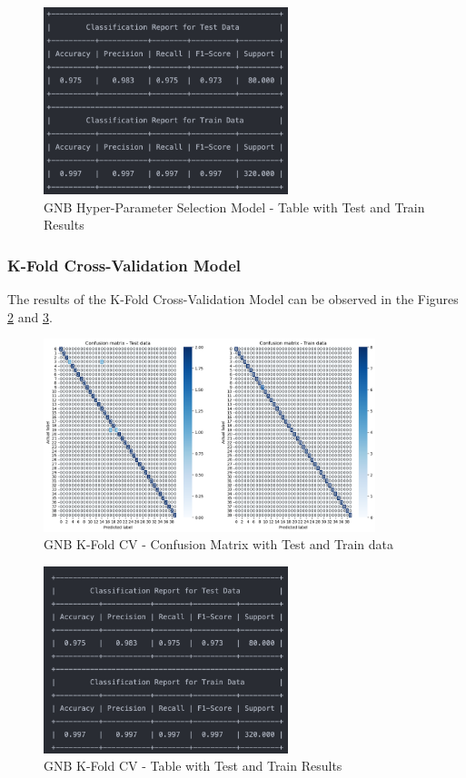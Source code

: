 \documentclass[conference]{IEEEtran}
\begin{document}
\begin{figure}[H]
    \centering
    \includegraphics[width=2.8in]{GNB/r_2.png}%
    \caption{GNB Hyper-Parameter Selection Model - Table with Test and Train Results}%
    \label{fig:conf_gnb_r_2}%
\end{figure}

\subsubsection{K-Fold Cross-Validation Model}
The results of the K-Fold Cross-Validation Model can be observed in the Figures \ref{fig:conf_gnb_3} and \ref{fig:conf_gnb_r_3}. 

\begin{figure}[H]
    \centering
    \includegraphics[width=3.8in]{GNB/3.png}%
    \caption{GNB K-Fold CV - Confusion Matrix with Test and Train data}%
    \label{fig:conf_gnb_3}%
\end{figure}

\begin{figure}[H]
    \centering
    \includegraphics[width=2.8in]{GNB/r_3.png}%
    \caption{GNB K-Fold CV - Table with Test and Train Results}%
    \label{fig:conf_gnb_r_3}%
\end{figure}
\end{document}

